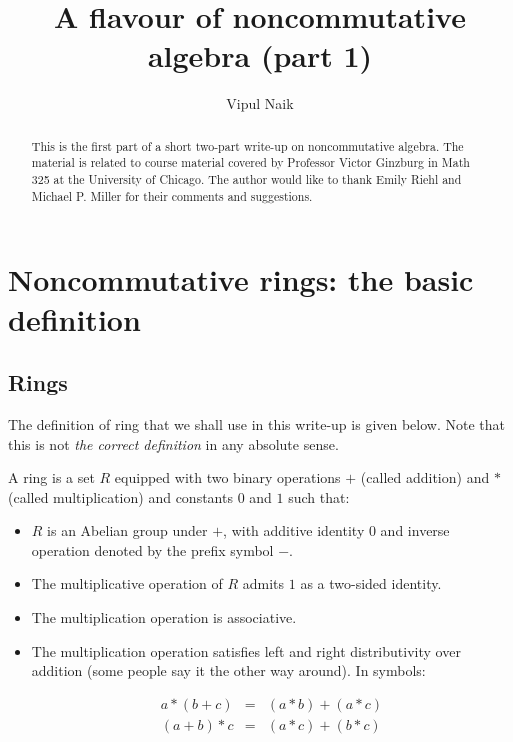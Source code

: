 \documentclass[a4paper]{amsart}
\title{A flavour of noncommutative algebra (part 1)}
\author{Vipul Naik}
\begin{document}
\maketitle

\begin{abstract}
  This is the first part of a short two-part write-up on
  noncommutative algebra. The material is related to course material
  covered by Professor Victor Ginzburg in Math 325 at the University
  of Chicago. The author would like to thank Emily Riehl and Michael
  P. Miller for their comments and suggestions.
\end{abstract}

\section{Noncommutative rings: the basic definition}

\subsection{Rings}

The definition of ring that we shall use in this write-up is given
below. Note that this is not {\em the correct definition} in any
absolute sense.

\begin{definer}[Ring]
  A ring is a set $R$ equipped with two binary operations $+$ (called
  addition) and $*$ (called multiplication) and constants $0$ and $1$ such that:

  \begin{itemize}

  \item $R$ is an Abelian group under $+$, with additive identity $0$
    and inverse operation denoted by the prefix symbol $-$.

  \item The multiplicative operation of $R$ admits $1$ as a two-sided
    identity.

  \item The multiplication operation is associative.

  \item The multiplication operation satisfies left and right
    distributivity over addition (some people say it the other way
    around). In symbols:

    \begin{eqnarray*}
      a * (b + c) & = & (a * b) + (a * c)\\
      (a + b) * c & = & (a * c) + (b * c)
    \end{eqnarray*}

  \end{itemize}
\end{definer}
\end{document}
